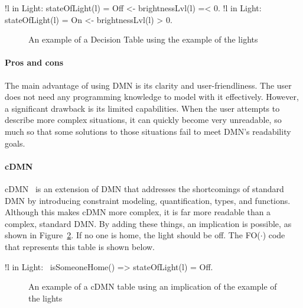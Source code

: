 \documentclass[11pt,a4paper]{report}
\newcommand{\fodot}{FO($\cdot$)\xspace}
\begin{document}
\begin{idplisting}
    {
       !l in Light: stateOfLight(l) = Off <- brightnessLvl(l) =< 0.
       !l in Light: stateOfLight(l) = On <- brightnessLvl(l) > 0.
    }
\end{idplisting}

\begin{figure}
    \centering
    \caption{An example of a Decision Table using the example of the lights}
    \label{fig:DT}
\end{figure}


\paragraph{ Pros and cons}
The main advantage of using DMN is its clarity and user-friendliness. The user does not need any programming knowledge to model with it effectively. However, a significant drawback is its limited capabilities. When the user attempts to describe more complex situations, it can quickly become very unreadable, so much so that some solutions to those situations fail to meet DMN's readability goals.
 
\paragraph{cDMN}
cDMN~\cite{cDMN} is an extension of DMN that addresses the shortcomings of standard DMN by introducing constraint modeling, quantification, types, and functions. Although this makes cDMN more complex, it is far more readable than a complex, standard DMN. By adding these things, an implication is possible, as shown in Figure~\ref{fig:cDMNTable}. If no one is home, the light should be off. The \fodot code that represents this table is shown below.
 
\begin{idplisting}
    !l in Light: ~isSomeoneHome() => stateOfLight(l) = Off.
\end{idplisting}

\begin{figure}
    \centering
    \caption{An example of a cDMN table using an implication of the example of the lights}
    \label{fig:cDMNTable}
\end{figure}
 
\end{document}
